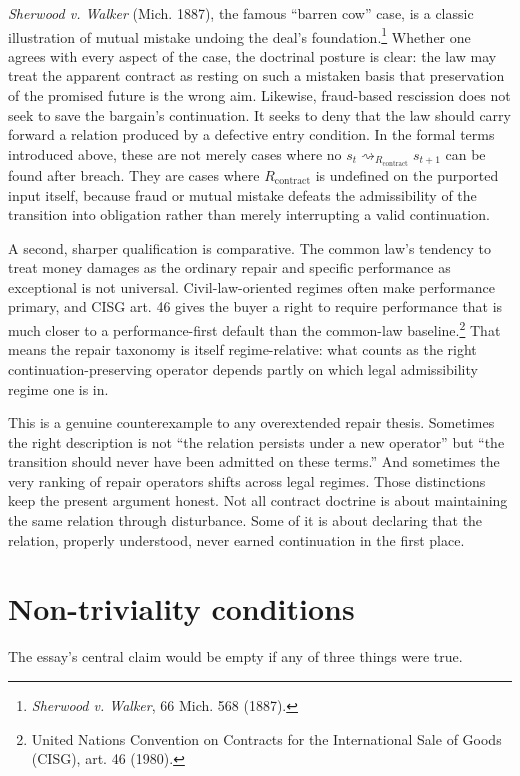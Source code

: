 \documentclass[11pt]{article}
\begin{document}
\textit{Sherwood v. Walker} (Mich. 1887), the famous ``barren cow'' case, is a classic illustration of mutual mistake undoing the deal's foundation.\footnote{\textit{Sherwood v. Walker}, 66 Mich. 568 (1887).} Whether one agrees with every aspect of the case, the doctrinal posture is clear: the law may treat the apparent contract as resting on such a mistaken basis that preservation of the promised future is the wrong aim. Likewise, fraud-based rescission does not seek to save the bargain's continuation. It seeks to deny that the law should carry forward a relation produced by a defective entry condition. In the formal terms introduced above, these are not merely cases where no $s_t \rightsquigarrow_{R_{\mathrm{contract}}} s_{t+1}$ can be found after breach. They are cases where $R_{\mathrm{contract}}$ is undefined on the purported input itself, because fraud or mutual mistake defeats the admissibility of the transition into obligation rather than merely interrupting a valid continuation.

A second, sharper qualification is comparative. The common law's tendency to treat money damages as the ordinary repair and specific performance as exceptional is not universal. Civil-law-oriented regimes often make performance primary, and CISG art. 46 gives the buyer a right to require performance that is much closer to a performance-first default than the common-law baseline.\footnote{United Nations Convention on Contracts for the International Sale of Goods (CISG), art. 46 (1980).} That means the repair taxonomy is itself regime-relative: what counts as the right continuation-preserving operator depends partly on which legal admissibility regime one is in.

This is a genuine counterexample to any overextended repair thesis. Sometimes the right description is not ``the relation persists under a new operator'' but ``the transition should never have been admitted on these terms.'' And sometimes the very ranking of repair operators shifts across legal regimes. Those distinctions keep the present argument honest. Not all contract doctrine is about maintaining the same relation through disturbance. Some of it is about declaring that the relation, properly understood, never earned continuation in the first place.

\section{Non-triviality conditions}
The essay's central claim would be empty if any of three things were true.
\end{document}
